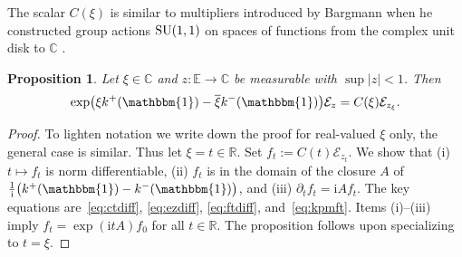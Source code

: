\documentclass[10pt,a4paper]{amsart}
\numberwithin{equation}{section}
\newtheorem{Proposition}[Theorem]{Proposition}
 { \theoremstyle{definition}
\newtheorem{Definition}[Theorem]{Definition}
\newtheorem{Example}[Theorem]{Example}
\newtheorem{Remark}[Theorem]{Remark}
}
\newcommand{\R}{\mathbb{R}}
\newcommand{\C}{\mathbb{C}}
\newcommand{\E}{\mathbb{E}}
\newcommand{\1}{\mathbbm{1}}
\begin{document}
The scalar $C(\xi)$ is similar to multipliers introduced by Bargmann when he constructed group actions ${\rm SU}(1,1)$ on spaces of functions from the complex unit disk to $\C$ \cite[Section 9]{bargmann1947}.

\begin{Proposition} \label{prop:expo-trafo}
	Let $\xi \in \C$ and $z\colon\E\to \C$ be measurable with $\sup |z|<1$.
	Then
	\[
		\exp\bigl( \xi k^+(\1) - \overline \xi k^-(\1)\bigr) \mathcal E_z = C(\xi) \mathcal E_{z_\xi}.
	\]
\end{Proposition}

\begin{proof}
	To lighten notation we write down the proof for real-valued $\xi$ only, the general case is similar. Thus let $\xi = t\in \R$. Set $f_t:= C(t) \mathcal E_{z_t}$. We show that (i) $t\mapsto f_t$ is norm differentiable, (ii) $ f_t$ is in the domain of the closure $A$ of $\frac 1{\mathrm i } \bigl(k^+(\1) - k^-(\1)\bigr)$, and (iii) $\partial_t f_t = \mathrm i A f_t$. The key equations are~\eqref{eq:ctdiff}, \eqref{eq:ezdiff}, \eqref{eq:ftdiff}, and~\eqref{eq:kpmft}. Items (i)--(iii) imply $f_t = \exp(\mathrm i t A) f_0$ for all $t\in\R$. The proposition follows upon specializing to $t = \xi$.


\end{proof}
\end{document}
